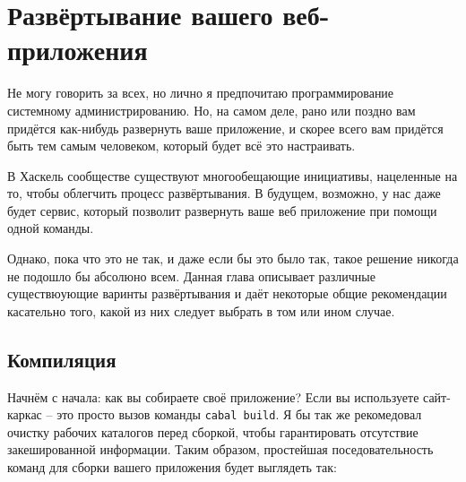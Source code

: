 \section{Развёртывание вашего веб-приложения}
%
%

Не могу говорить за всех, но лично я предпочитаю программирование системному администрированию. Но, на самом деле, рано или поздно вам придётся как-нибудь развернуть ваше приложение, и скорее всего вам придётся быть тем самым человеком, который будет всё это настраивать. 

%
В Хаскель сообществе существуют многообещающие инициативы, нацеленные на то, чтобы облегчить процесс развёртывания. В будущем, возможно, у нас даже будет сервис, который позволит развернуть ваше веб приложение при помощи одной команды.

%
Однако, пока что это не так, и даже если бы это было так, такое решение никогда не подошло бы абсолюно всем. Данная глава описывает различные существюующие варинты развёртывания и даёт некоторые общие рекомендации касательно того, какой из них следует выбрать в том или ином случае.

\subsection{Компиляция}
%
%
Начнём с начала: как вы собираете своё приложение? Если вы используете сайт-каркас %
-- это просто вызов команды \lstinline{cabal build}. Я бы так же рекомедовал очистку рабочих каталогов перед сборкой, чтобы гарантировать отсутствие закешированной информации. Таким образом, простейшая поседовательность команд для сборки вашего приложения будет выглядеть так:


